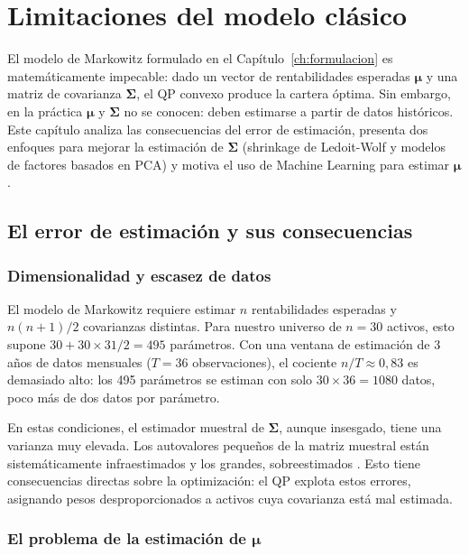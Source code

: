 \chapter{Limitaciones del modelo clásico}
\label{ch:limitaciones}

El modelo de Markowitz formulado en el Capítulo~\ref{ch:formulacion} es
matemáticamente impecable: dado un vector de rentabilidades esperadas
$\boldsymbol{\mu}$ y una matriz de covarianza $\boldsymbol{\Sigma}$, el
QP convexo produce la cartera óptima. Sin embargo, en la práctica
$\boldsymbol{\mu}$ y $\boldsymbol{\Sigma}$ no se conocen: deben
estimarse a partir de datos históricos. Este capítulo analiza las
consecuencias del error de estimación, presenta dos enfoques para
mejorar la estimación de $\boldsymbol{\Sigma}$ (shrinkage de Ledoit-Wolf
y modelos de factores basados en PCA) y motiva el uso de Machine Learning para estimar
$\boldsymbol{\mu}$.

\section{El error de estimación y sus consecuencias}

\subsection{Dimensionalidad y escasez de datos}

El modelo de Markowitz requiere estimar $n$ rentabilidades esperadas y
$n(n+1)/2$ covarianzas distintas. Para nuestro universo de $n = 30$
activos, esto supone $30 + 30 \times 31 / 2 = 495$ parámetros. Con una
ventana de estimación de 3 años de datos mensuales ($T = 36$
observaciones), el cociente $n/T \approx 0{,}83$ es demasiado alto: los
495 parámetros se estiman con solo $30 \times 36 = 1080$ datos, poco más
de dos datos por parámetro.

En estas condiciones, el estimador muestral de $\boldsymbol{\Sigma}$,
aunque insesgado, tiene una varianza muy elevada. Los autovalores
pequeños de la matriz muestral están sistemáticamente infraestimados
y los grandes, sobreestimados \cite{Ledoit2004}. Esto tiene
consecuencias directas sobre la optimización: el QP explota estos
errores, asignando pesos desproporcionados a activos cuya covarianza
está mal estimada.

\subsection{El problema de la estimación de \texorpdfstring{$\boldsymbol{\mu}$}{μ}}

